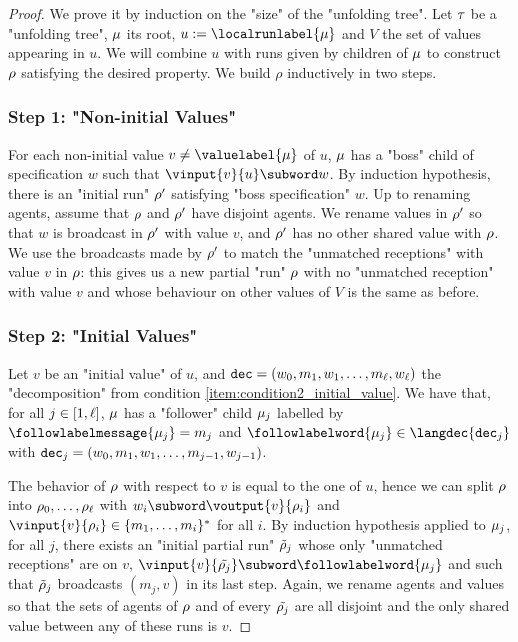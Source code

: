 \begin{proof}
We prove it by induction on the "size" of the "unfolding tree".
Let $\tau$ be a "unfolding tree", $\mu$ its root, $u := \localrunlabel{\node}$ and $V$ the set of values appearing in $u$. 
We will combine $u$ with runs given by children of $\mu$ to construct $\rho$ satisfying the desired property. We build $\rho$ inductively in two steps. 

\subsubsection{Step 1: "Non-initial Values"}
\label{sec:tree-to-run-step-one}

For each non-initial value $v \ne \valuelabel{\node}$ of $u$, $\mu$ has a "boss" child of specification $w$ such that $\vinput{v}{u} \subword w$.
By induction hypothesis, there is an "initial run" $\rho'$ satisfying "boss specification" $w$. Up to renaming agents, assume that $\rho$ and $\rho'$ have disjoint agents.
We rename values in $\rho'$ so that $w$ is broadcast in $\rho'$ with value $v$, and $\rho'$ has no other shared value with $\rho$. 
We use the broadcasts made by $\rho'$ to match the "unmatched receptions" with value $v$ in $\rho$: this gives us a new partial "run" $\rho$ with no "unmatched reception" with value $v$ and whose behaviour on other values of $V$ is the same as before.

\subsubsection{Step 2: "Initial Values"}
\label{sec:tree-to-run-step-two}


Let $v$ be an "initial value" of $u$, and $\mathtt{dec} = \\(w_0, m_1, w_1, \ldots, m_\ell, w_\ell)$ the "decomposition" from condition \ref{item:condition2_initial_value}. We have that, for all $j \in [1,\ell]$, $\mu$ has a "follower" child $\mu_j$ labelled by $\followlabelmessage{\node_j} = m_j$ and $\followlabelword{\node_j} \in \langdec{\decsymb_j}$ with $\mathtt{dec}_j = (w_0, m_1, w_1, \ldots, m_{j-1}, w_{j-1})$. 

The behavior of $\rho$ with respect to $v$ is equal to the one of $u$, hence we can split $\rho$ into $\rho_0, \ldots, \rho_\ell$ with $w_i \subword \voutput{\aval}{\run_i}$ and $\vinput{\aval}{\run_i} \in \set{m_1, \dots, m_{i}}^*$ for all $i$. 
By induction hypothesis applied to $\mu_j$, for all $j$, there exists an "initial partial run" $\Tilde{\rho}_j$ whose only "unmatched receptions" are on $v$, $\vinput{v}{\Tilde{\run_j}} \subword \followlabelword{\node_{j}}$ and such that $\Tilde{\rho}_j$ broadcasts $(m_j,v)$ in its last step. Again, we rename agents and values so that the sets of agents of $\rho$ and of every $\Tilde{\rho_j}$ are all disjoint and the only shared value between any of these runs is $v$. 


\end{proof}
